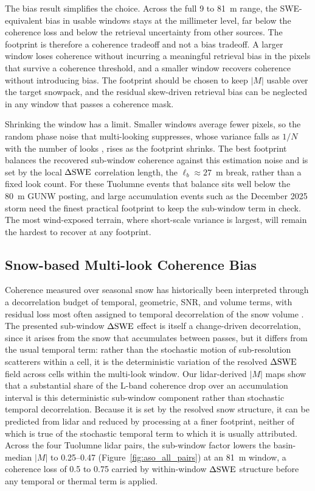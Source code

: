 \documentclass[journal abbreviation, manuscript]{copernicus}
\begin{document}
The bias result simplifies the choice. Across the full 9 to 81~m range, the SWE-equivalent bias in usable windows stays at the millimeter level, far below the coherence loss and below the retrieval uncertainty from other sources. The footprint is therefore a coherence tradeoff and not a bias tradeoff. A larger window loses coherence without incurring a meaningful retrieval bias in the pixels that survive a coherence threshold, and a smaller window recovers coherence without introducing bias. The footprint should be chosen to keep $|M|$ usable over the target snowpack, and the residual skew-driven retrieval bias can be neglected in any window that passes a coherence mask.

Shrinking the window has a limit. Smaller windows average fewer pixels, so the random phase noise that multi-looking suppresses, whose variance falls as $1/N$ with the number of looks \citep{Bamler1998}, rises as the footprint shrinks. The best footprint balances the recovered sub-window coherence against this estimation noise and is set by the local $\Delta\mathrm{SWE}$ correlation length, the $\ell_b \approx 27$~m break, rather than a fixed look count. For these Tuolumne events that balance sits well below the 80~m GUNW posting, and large accumulation events such as the December 2025 storm need the finest practical footprint to keep the sub-window term in check. The most wind-exposed terrain, where short-scale variance is largest, will remain the hardest to recover at any footprint.

\subsection{Snow-based Multi-look Coherence Bias}\label{subsec:coherence-bias}

Coherence measured over seasonal snow has historically been interpreted through a decorrelation budget of temporal, geometric, SNR, and volume terms, with residual loss most often assigned to temporal decorrelation of the snow volume \citep{Ruiz2021, Oveisgharan2024}. The presented sub-window $\Delta\mathrm{SWE}$ effect is itself a change-driven decorrelation, since it arises from the snow that accumulates between passes, but it differs from the usual temporal term: rather than the stochastic motion of sub-resolution scatterers within a cell, it is the deterministic variation of the resolved $\Delta\mathrm{SWE}$ field across cells within the multi-look window. Our lidar-derived $|M|$ maps show that a substantial share of the L-band coherence drop over an accumulation interval is this deterministic sub-window component rather than stochastic temporal decorrelation. Because it is set by the resolved snow structure, it can be predicted from lidar and reduced by processing at a finer footprint, neither of which is true of the stochastic temporal term to which it is usually attributed.  Across the four Tuolumne lidar pairs, the sub-window factor lowers the basin-median $|M|$ to 0.25--0.47 (Figure~\ref{fig:aso_all_pairs}) at an 81~m window, a coherence loss of 0.5 to 0.75 carried by within-window $\Delta\mathrm{SWE}$ structure before any temporal or thermal term is applied. 
\end{document}
